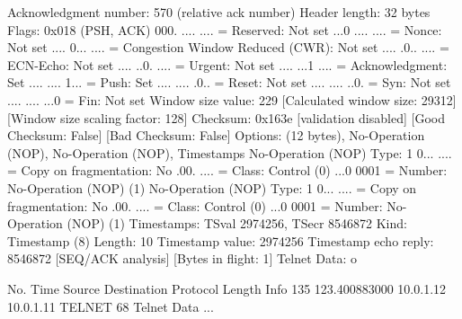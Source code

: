     Acknowledgment number: 570    (relative ack number)
    Header length: 32 bytes
    Flags: 0x018 (PSH, ACK)
        000. .... .... = Reserved: Not set
        ...0 .... .... = Nonce: Not set
        .... 0... .... = Congestion Window Reduced (CWR): Not set
        .... .0.. .... = ECN-Echo: Not set
        .... ..0. .... = Urgent: Not set
        .... ...1 .... = Acknowledgment: Set
        .... .... 1... = Push: Set
        .... .... .0.. = Reset: Not set
        .... .... ..0. = Syn: Not set
        .... .... ...0 = Fin: Not set
    Window size value: 229
    [Calculated window size: 29312]
    [Window size scaling factor: 128]
    Checksum: 0x163e [validation disabled]
        [Good Checksum: False]
        [Bad Checksum: False]
    Options: (12 bytes), No-Operation (NOP), No-Operation (NOP), Timestamps
        No-Operation (NOP)
            Type: 1
                0... .... = Copy on fragmentation: No
                .00. .... = Class: Control (0)
                ...0 0001 = Number: No-Operation (NOP) (1)
        No-Operation (NOP)
            Type: 1
                0... .... = Copy on fragmentation: No
                .00. .... = Class: Control (0)
                ...0 0001 = Number: No-Operation (NOP) (1)
        Timestamps: TSval 2974256, TSecr 8546872
            Kind: Timestamp (8)
            Length: 10
            Timestamp value: 2974256
            Timestamp echo reply: 8546872
    [SEQ/ACK analysis]
        [Bytes in flight: 1]
Telnet
    Data: o

No.     Time           Source                Destination           Protocol Length Info
    135 123.400883000  10.0.1.12             10.0.1.11             TELNET   68     Telnet Data ...

